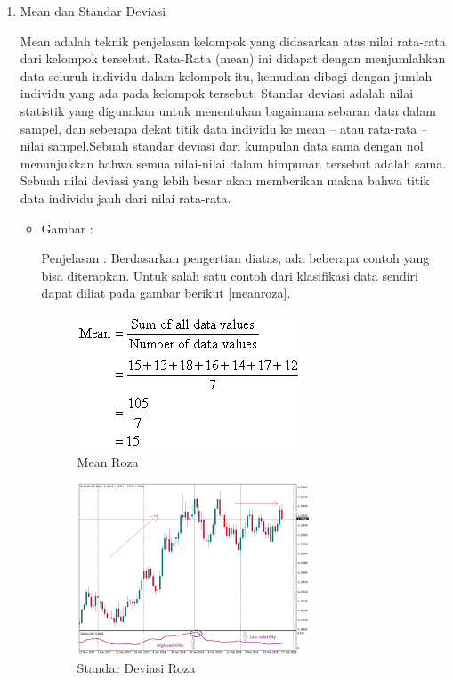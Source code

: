 \begin{enumerate}
\item Mean dan Standar Deviasi
\par Mean adalah teknik penjelasan kelompok yang didasarkan atas nilai rata-rata dari kelompok tersebut. Rata-Rata (mean) ini didapat dengan menjumlahkan data seluruh individu dalam kelompok itu, kemudian dibagi dengan jumlah individu yang ada pada kelompok tersebut. Standar deviasi adalah nilai statistik yang digunakan untuk menentukan bagaimana sebaran data dalam sampel, dan seberapa dekat titik data individu ke mean – atau rata-rata – nilai sampel.Sebuah standar deviasi dari kumpulan data sama dengan nol menunjukkan bahwa semua nilai-nilai dalam himpunan tersebut adalah sama. Sebuah nilai deviasi yang lebih besar akan memberikan makna bahwa titik data individu jauh dari nilai rata-rata.
\par
\begin{itemize}
\item Gambar :
\par Penjelasan : Berdasarkan pengertian diatas, ada beberapa contoh yang bisa diterapkan. Untuk salah satu contoh dari klasifikasi data sendiri dapat diliat pada gambar berikut \ref{meanroza}.
\begin{figure}[!hbtp]
\centering
\includegraphics[scale=0.5]{figures/meanroza.png}
\caption{Mean Roza}
\label{text-fadila}
\end{figure}
\begin{figure}[!hbtp]
\centering
\includegraphics[scale=0.7]{figures/standarroza.png}
\caption{Standar Deviasi Roza}
\label{text-fadila}
\end{figure}
\par
\end{itemize}


\end{enumerate}
